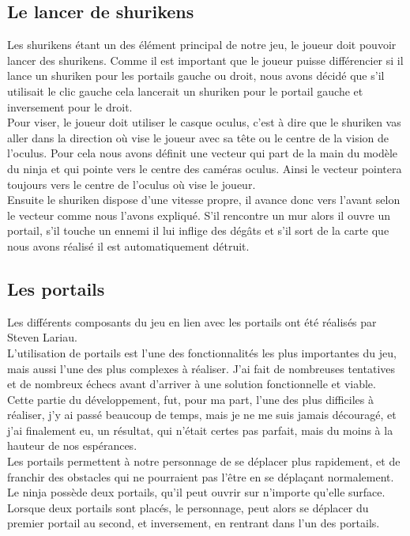 \documentclass[12pt]{article}
\begin{document}
\subsection{Le lancer de shurikens}

Les shurikens étant un des élément principal de notre jeu, le joueur doit pouvoir lancer des shurikens. Comme il est important que le joueur puisse différencier si il lance un shuriken pour les portails gauche ou droit, nous avons décidé que s'il utilisait le clic gauche cela lancerait un shuriken pour le portail gauche et inversement pour le droit.\\
Pour viser, le joueur doit utiliser le casque oculus, c'est à dire que le shuriken vas aller dans la direction où vise le joueur avec sa tête ou le centre de la vision de l'oculus. Pour cela nous avons définit une vecteur qui part de la main du modèle du ninja et qui pointe vers le centre des caméras oculus. Ainsi le vecteur pointera toujours vers le centre de l'oculus où vise le joueur.\\

Ensuite le shuriken dispose d'une vitesse propre, il avance donc vers l'avant selon le vecteur comme nous l'avons expliqué. S'il rencontre un mur alors il ouvre un portail, s'il touche un ennemi il lui inflige des dégâts et s'il sort de la carte que nous avons réalisé il est automatiquement détruit.


\subsection{Les portails}

Les différents composants du jeu en lien avec les portails ont été réalisés par Steven Lariau.\\
L'utilisation de portails est l'une des fonctionnalités les plus importantes du jeu, mais aussi l'une des plus complexes à réaliser. J'ai fait de nombreuses tentatives et de nombreux échecs avant d'arriver à une solution fonctionnelle et viable. Cette partie du développement, fut, pour ma part, l'une des plus difficiles à réaliser, j'y ai passé beaucoup de temps, mais je ne me suis jamais découragé, et j'ai finalement eu, un résultat, qui n'était certes pas parfait, mais du moins à la hauteur de nos espérances.\\
Les portails permettent à notre personnage de se déplacer plus rapidement, et de franchir des obstacles qui ne pourraient pas l'être en se déplaçant normalement. Le ninja possède deux portails, qu'il peut ouvrir sur n'importe qu'elle surface.\\
Lorsque deux portails sont placés, le personnage, peut alors se déplacer du premier portail au second, et inversement, en rentrant dans l'un des portails.
\end{document}
